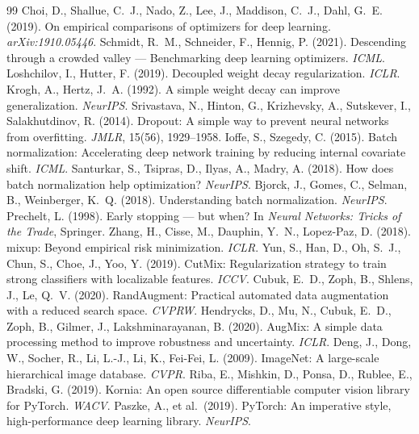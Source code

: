 \documentclass[10pt,letterpaper]{article}
\begin{document}
\begin{thebibliography}{99}
 Choi, D., Shallue, C.~J., Nado, Z., Lee, J., Maddison, C.~J., Dahl, G.~E. (2019). On empirical comparisons of optimizers for deep learning. \emph{arXiv:1910.05446}.
 Schmidt, R.~M., Schneider, F., Hennig, P. (2021). Descending through a crowded valley --- Benchmarking deep learning optimizers. \emph{ICML}.
 Loshchilov, I., Hutter, F. (2019). Decoupled weight decay regularization. \emph{ICLR}.
 Krogh, A., Hertz, J.~A. (1992). A simple weight decay can improve generalization. \emph{NeurIPS}.
 Srivastava, N., Hinton, G., Krizhevsky, A., Sutskever, I., Salakhutdinov, R. (2014). Dropout: A simple way to prevent neural networks from overfitting. \emph{JMLR}, 15(56), 1929--1958.
 Ioffe, S., Szegedy, C. (2015). Batch normalization: Accelerating deep network training by reducing internal covariate shift. \emph{ICML}.
 Santurkar, S., Tsipras, D., Ilyas, A., Madry, A. (2018). How does batch normalization help optimization? \emph{NeurIPS}.
 Bjorck, J., Gomes, C., Selman, B., Weinberger, K.~Q. (2018). Understanding batch normalization. \emph{NeurIPS}.
 Prechelt, L. (1998). Early stopping --- but when? In \emph{Neural Networks: Tricks of the Trade}, Springer.
 Zhang, H., Cisse, M., Dauphin, Y.~N., Lopez-Paz, D. (2018). mixup: Beyond empirical risk minimization. \emph{ICLR}.
 Yun, S., Han, D., Oh, S.~J., Chun, S., Choe, J., Yoo, Y. (2019). CutMix: Regularization strategy to train strong classifiers with localizable features. \emph{ICCV}.
 Cubuk, E.~D., Zoph, B., Shlens, J., Le, Q.~V. (2020). RandAugment: Practical automated data augmentation with a reduced search space. \emph{CVPRW}.
 Hendrycks, D., Mu, N., Cubuk, E.~D., Zoph, B., Gilmer, J., Lakshminarayanan, B. (2020). AugMix: A simple data processing method to improve robustness and uncertainty. \emph{ICLR}.
 Deng, J., Dong, W., Socher, R., Li, L.-J., Li, K., Fei-Fei, L. (2009). ImageNet: A large-scale hierarchical image database. \emph{CVPR}.
 Riba, E., Mishkin, D., Ponsa, D., Rublee, E., Bradski, G. (2019). Kornia: An open source differentiable computer vision library for PyTorch. \emph{WACV}.
 Paszke, A., et al.\ (2019). PyTorch: An imperative style, high-performance deep learning library. \emph{NeurIPS}.
\end{thebibliography}
\end{document}

